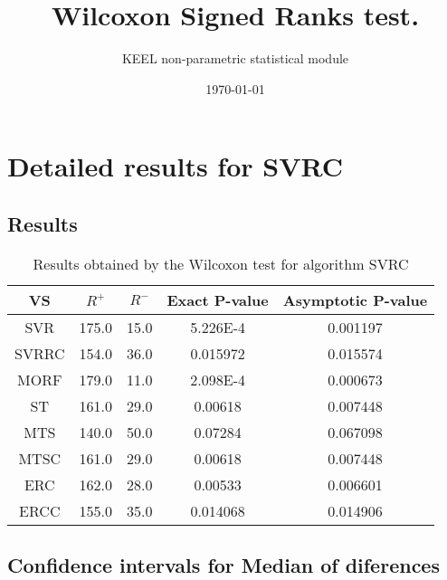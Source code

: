 \documentclass[a4paper,10pt]{article}
\title{Wilcoxon Signed Ranks test.}
\date{\today}
\author{KEEL non-parametric statistical module}
\begin{document}
\pagestyle{empty}
\maketitle
\thispagestyle{empty}



\section{Detailed results for SVRC}


\subsection{Results}

\begin{table}[!htp]
\centering\small
\begin{tabular}{
|c|c|c|c|c|}
\hline
 VS & $R^{+}$ & $R^{-}$ & Exact P-value & Asymptotic P-value \\ \hline 
SVR & 175.0 & 15.0 & 5.226E-4 & 0.001197\\ \hline 
SVRRC & 154.0 & 36.0 & 0.015972 & 0.015574\\ \hline 
MORF & 179.0 & 11.0 & 2.098E-4 & 0.000673\\ \hline 
ST & 161.0 & 29.0 & 0.00618 & 0.007448\\ \hline 
MTS & 140.0 & 50.0 & 0.07284 & 0.067098\\ \hline 
MTSC & 161.0 & 29.0 & 0.00618 & 0.007448\\ \hline 
ERC & 162.0 & 28.0 & 0.00533 & 0.006601\\ \hline 
ERCC & 155.0 & 35.0 & 0.014068 & 0.014906\\ \hline 

\end{tabular}
\caption{Results obtained by the Wilcoxon test for algorithm SVRC}
\end{table}

\subsection{Confidence intervals for Median of diferences}
\end{document}

